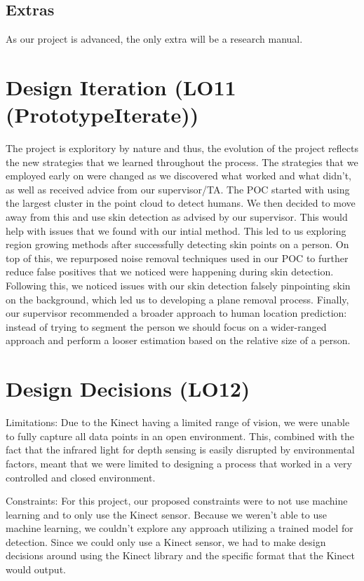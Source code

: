 \documentclass{article}
\begin{document}
\subsection{Extras}

As our project is advanced, the only extra will be a research manual.

\section{Design Iteration (LO11 (PrototypeIterate))}

The project is exploritory by nature and thus, the evolution of the project reflects the new strategies that we learned throughout the process. 
The strategies that we employed early on were changed as we discovered what worked and what didn't, as well as received advice from our supervisor/TA.
The POC started with using the largest cluster in the point cloud to detect humans. We then decided to move away from this and use skin detection as advised by our supervisor.
This would help with issues that we found with our intial method. This led to us exploring region growing methods after successfully detecting skin points on a person. 
On top of this, we repurposed noise removal techniques used in our POC to further reduce false positives that we noticed were happening during skin detection.
Following this, we noticed issues with our skin detection falsely pinpointing skin on the background, which led us to developing a plane removal process. Finally, 
our supervisor recommended a broader approach to human location prediction: instead of trying to segment the person we should focus on a wider-ranged approach and perform a looser estimation based on the relative size of a person.

\section{Design Decisions (LO12)}

Limitations: Due to the Kinect having a limited range of vision, we were unable to fully capture all data points in an open environment. This,
combined with the fact that the infrared light for depth sensing is easily disrupted by environmental factors, meant that we were limited to designing 
a process that worked in a very controlled and closed environment.

Constraints: For this project, our proposed constraints were to not use machine learning and to only use the Kinect sensor.
Because we weren't able to use machine learning, we couldn't explore any approach utilizing a trained model for detection. Since
we could only use a Kinect sensor, we had to make design decisions around using the Kinect library and the specific format that the Kinect would output. 
\end{document}
